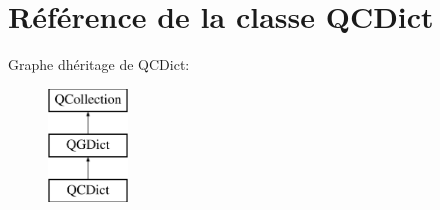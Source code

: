 \hypertarget{class_q_c_dict}{}\section{Référence de la classe Q\+C\+Dict}
\label{class_q_c_dict}
Graphe d\textquotesingle{}héritage de Q\+C\+Dict\+:\begin{figure}[H]
\begin{center}
\leavevmode
\includegraphics[height=3.000000cm]{class_q_c_dict}
\end{center}
\end{figure}
